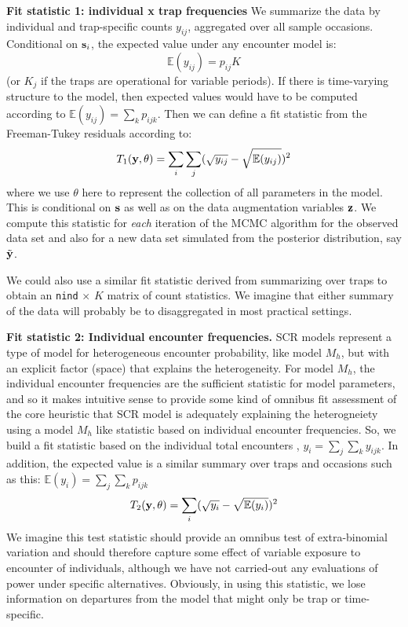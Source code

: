 {\bf Fit statistic 1: individual x trap frequencies} We summarize the
data by individual and trap-specific counts $y_{ij}$, aggregated over
all sample occasions. Conditional on ${\bf s}_{i}$, the expected value
under any encounter model is:
\[
 \mathbb{E}(y_{ij}) = p_{ij} K
\]
(or $K_{j}$ if the traps are operational for variable periods). If
there is time-varying structure to the model, then expected values
would have to be computed according to $\mathbb{E}(y_{ij}) = \sum_{k} p_{ijk}$.
Then we can define a fit statistic from the Freeman-Tukey residuals
according to:
\[
 T_{1}({\bf y}, \theta) = \sum_{i}\sum_{j} (\sqrt{ y_{ij} } - \sqrt{ \mathbb{E}(y_{ij}) })^2
\]
where we use $\theta$ here to represent the collection of all
parameters in the model.  This is conditional on ${\bf s}$ as well as
on the data augmentation variables ${\bf z}$. We compute this
statistic for {\it each} iteration of the MCMC algorithm for the
observed data set and also for a new data set simulated from the posterior
distribution, say $\tilde{\bf y}$.

We could also use a similar fit statistic derived from summarizing
over traps to obtain an \mbox{\tt nind} $\times$ $K$ matrix of count
statistics.  We imagine that either summary of the data will probably
be to disaggregated in most practical settings.


{\bf Fit statistic 2: Individual encounter frequencies. } SCR models
represent a type of model for heterogeneous encounter probability, like model $M_h$, but with an explicit
factor (space) that explains the heterogeneity. For model $M_h$, the
individual encounter frequencies are the sufficient statistic for
model parameters, and so it makes intuitive sense to provide some kind
of omnibus fit assessment of the core heuristic that SCR model is
adequately explaining the heterogneiety using a model $M_h$ like
statistic based on individual encounter frequencies.  So, we build a
fit statistic based on the individual total encounters
\citep{russell_etal:2012}, $y_{i} = \sum_{j} \sum_{k} y_{ijk}$. In
addition, the expected value is a similar summary over traps and
occasions such as this: $\mathbb{E}(y_{i}) = \sum_{j} \sum_{k}
p_{ijk}$
\[
 T_{2}({\bf y}, \theta) = \sum_{i} (\sqrt{ y_{i} } - \sqrt{ \mathbb{E}(y_{i}) })^2
\]
We imagine this test statistic should provide an omnibus test of
extra-binomial variation and should therefore capture some effect of
variable exposure to encounter of individuals, although we have not
carried-out any evaluations of power under specific alternatives.
Obviously, in using this statistic, we lose information on departures
from the model that might only be trap or time-specific.


